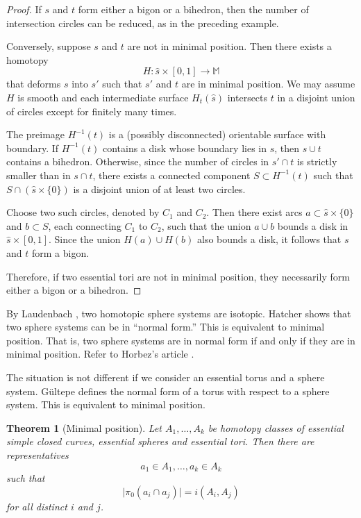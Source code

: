 \documentclass[12pt,a4paper]{amsart}
\numberwithin{equation}{section}
\newcommand{\MM}{\mathbb{M}}
\theoremstyle{plain}
\newtheorem{theorem}{Theorem}[section]
\theoremstyle{definition}
\theoremstyle{remark}
\begin{document}
\begin{proof}
    If $s$ and $t$ form either a bigon or a bihedron, then the number of intersection circles can be reduced, as in the preceding example.
    
    Conversely, suppose \(s\) and \(t\) are not in minimal position.
    Then there exists a homotopy 
    \[
        H : \hat{s} \times [0,1] \to \MM
    \]
    that deforms \(s\) into \(s'\) such that \(s'\) and \(t\) are in minimal position.
    We may assume \(H\) is smooth and each intermediate surface \(H_t(\hat{s})\) intersects \(t\) in a disjoint union of circles except for finitely many times.
    
    The preimage \(H^{-1}(t)\) is a (possibly disconnected) orientable surface with boundary.  
    If \(H^{-1}(t)\) contains a disk whose boundary lies in \(s\), then \(s \cup t\) contains a bihedron.  
    Otherwise, since the number of circles in \(s' \cap t\) is strictly smaller than in \(s \cap t\), there exists a connected component \(S \subset H^{-1}(t)\) such that \(S \cap (\hat{s} \times \{0\})\) is a disjoint union of at least two circles.
    
    Choose two such circles, denoted by $C_1$ and $C_2$.
    Then there exist arcs $a \subset \hat{s} \times \{0\}$ and $b \subset S$, each connecting $C_1$ to $C_2$, such that the union $a \cup b$ bounds a disk in $\hat{s} \times [0,1]$.
    Since the union $H(a) \cup H(b)$ also bounds a disk, it follows that $s$ and $t$ form a bigon.
    
    Therefore, if two essential tori are not in minimal position, they necessarily form either a bigon or a bihedron.
\end{proof}

By Laudenbach \cite{MR356056}, two homotopic sphere systems are isotopic.
Hatcher \cite{MR1314940} shows that two sphere systems can be in ``normal form.''
This is equivalent to minimal position.
That is, two sphere systems are in normal form if and only if they are in minimal position.
Refer to Horbez's article \cite{MR3020214}.

The situation is not different if we consider an essential torus and a sphere system.
G{\"u}ltepe \cite{MR3043125} defines the normal form of a torus with respect to a sphere system.
This is equivalent to minimal position.

\begin{theorem}[Minimal position] \label{thm:minimal-position}
    Let $A_1, \dots, A_k$ be homotopy classes of essential simple closed curves, essential spheres and essential tori.
    Then there are representatives $$a_1 \in A_1, \dots, a_k \in A_k$$ such that $$\lvert \pi_0 (a_i \cap a_j) \rvert = i(A_i, A_j)$$ for all distinct $i$ and $j$.
\end{theorem}
\end{document}
